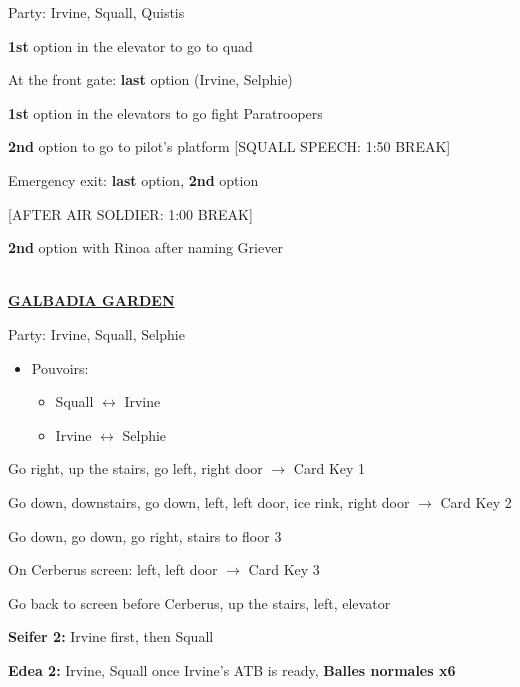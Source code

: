 Party: Irvine, Squall, Quistis

\textbf{1st} option in the elevator to go to quad

At the front gate: \textbf{last} option (Irvine, Selphie)

\textbf{1st} option in the elevators to go fight Paratroopers

\textbf{2nd} option to go to pilot's platform
[SQUALL SPEECH: 1:50 BREAK]

Emergency exit: \textbf{last} option, \textbf{2nd} option

[AFTER AIR SOLDIER: 1:00 BREAK]

\textbf{2nd} option with Rinoa after naming Griever

\leavevmode\\
\underline{\textbf{GALBADIA GARDEN}}

Party: Irvine, Squall, Selphie
\begin{itemize}
	\item Pouvoirs:
		\begin{itemize}
			\item Squall $\leftrightarrow$ Irvine
			\item Irvine $\leftrightarrow$ Selphie
		\end{itemize}
\end{itemize}

Go right, up the stairs, go left, right door $\rightarrow$ Card Key 1

Go down, downstairs, go down, left, left door, ice rink, right door $\rightarrow$ Card Key 2

Go down, go down, go right, stairs to floor 3

On Cerberus screen: left, left door $\rightarrow$ Card Key 3

Go back to screen before Cerberus, up the stairs, left, elevator

\textbf{Seifer 2:} Irvine first, then Squall

\textbf{Edea 2:} Irvine, Squall once Irvine's ATB is ready, \textbf{Balles normales x6}

\columnbreak